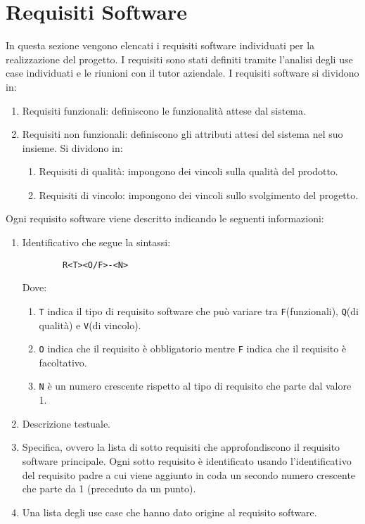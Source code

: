 \section{Requisiti Software}
\label{sec:requisiti_software}
In questa sezione vengono elencati i requisiti software individuati per la realizzazione del progetto.
I requisiti sono stati definiti tramite l'analisi degli use case individuati e le riunioni con il tutor aziendale.
I requisiti software si dividono in:
\begin{enumerate}
    \label{en:req_type}
    \item Requisiti funzionali: definiscono le funzionalità attese dal sistema.
    \item Requisiti non funzionali: definiscono gli attributi attesi del sistema nel suo insieme.
    Si dividono in:
    \begin{enumerate}
        \item Requisiti di qualità: impongono dei vincoli sulla qualità del prodotto.
        \item Requisiti di vincolo: impongono dei vincoli sullo svolgimento del progetto.
    \end{enumerate}
\end{enumerate}
Ogni requisito software viene descritto indicando le seguenti informazioni:
\begin{enumerate}
    \item Identificativo che segue la sintassi:
    \begin{lstlisting}
        R<T><O/F>-<N>
    \end{lstlisting}
    Dove:
    \begin{enumerate}
        \item \lstinline{T} indica il tipo di requisito software che può variare tra \lstinline{F}(funzionali), \lstinline{Q}(di qualità) e \lstinline{V}(di vincolo).
        \item \lstinline{O} indica che il requisito è obbligatorio mentre \lstinline{F} indica che il requisito è facoltativo.
        \item \lstinline{N} è un numero crescente rispetto al tipo di requisito che parte dal valore 1.
    \end{enumerate}
    \item Descrizione testuale.
    \item Specifica, ovvero la lista di sotto requisiti che approfondiscono il requisito software principale.
    Ogni sotto requisito è identificato usando l'identificativo del requisito padre a cui viene aggiunto in coda un secondo numero crescente che parte da 1 (preceduto da un punto).
    \item Una lista degli use case che hanno dato origine al requisito software.
\end{enumerate}





